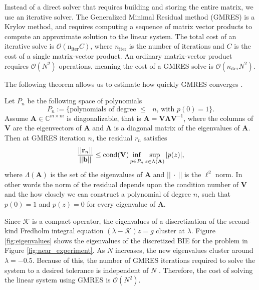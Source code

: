 Instead of a direct solver that requires building and storing the entire matrix, we use an iterative solver. The Generalized Minimal Residual method (GMRES) \cite{Saad1986} is a Krylov method, and requires computing a sequence of matrix vector products to compute an approximate solution to the linear system. The total cost of an iterative solve is $\mathcal{O}(\text{n}_\text{iter} C)$, where $n_{\text{iter}}$ is the number of iterations and $C$ is the cost of a single matrix-vector product. An ordinary matrix-vector product requires $\mathcal{O}(N^2)$ operations, meaning the cost of a GMRES solve is $\mathcal{O}(n_{\text{iter}} N^2)$. 

The following theorem allows us  to estimate how quickly GMRES converges \cite{Trefethen1997}. 
\begin{theorem}\label{them:gmres}
Let $P_n$ be the following space of polynomials
\[ P_n := \{\text{polynomials of degree $\leq$ $n$, with $p(0) = 1$}\}.\]
Assume $\mathbf{A}\in \mathbb{C}^{m\times m}$ is diagonalizable, that is $\mathbf{A} = \mathbf{V}\bm{\Lambda}\mathbf{V}^{-1}$, where the columns of $\mathbf{V}$ are the eigenvectors of $\mathbf{A}$ and $\bm{\Lambda}$ is a diagonal matrix of the eigenvalues of $\mathbf{A}$. Then at GMRES iteration $n$, the residual $r_n$ satisfies 
\[ \frac{||\mathbf{r}_n||}{||\bb||} \leq \text{cond}(\mathbf{V})\inf\limits_{p\in P_n}\sup\limits_{z\in \Lambda(\mathbf{A})} |p(z)|,\]
where $\Lambda(\mathbf{A})$ is the set of the eigenvalues of $\mathbf{A}$ and $||~\cdot~||$ is the $\ell^2$ norm. In other words the norm of the residual depends upon the condition number of $\mathbf{V}$ and the how closely we can construct a polynomial of degree $n$, such that $p(0) = 1$ and $p(z)=0$ for every eigenvalue of $\mathbf{A}$. 
\end{theorem}

Since $\mathcal{K}$ is a compact operator, the eigenvalues of a discretization of the second-kind Fredholm integral equation $(\lambda - \mathcal{K})z = g$ cluster at $\lambda$. Figure \ref{fig:eigenvalues} shows the eigenvalues of the discretized BIE for the problem in Figure \ref{fig:near_experiment}. As $N$ increases, the new eigenvalues cluster around $\lambda = -0.5$. Because of this, the number of GMRES iterations required to solve the system to a desired tolerance is independent of $N$ \cite{Campbell1996}. Therefore, the cost of solving the linear system using GMRES is $\mathcal{O}(N^2)$. 


